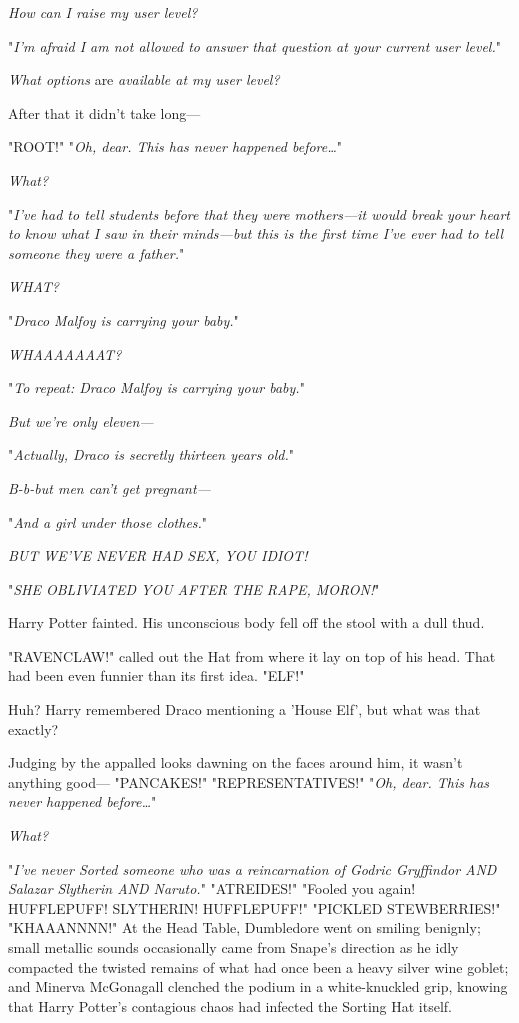\emph{How can I raise my user level?}

"\emph{I'm afraid I am not allowed to answer that question at your current user 
level.}"

\emph{What options} are\emph{ available at my user level?}

After that it didn't take long---

"ROOT!"
\sbreak
"\emph{Oh, dear. This has never happened before{\ldots}}"

\emph{What?}

"\emph{I've had to tell students before that they were mothers---it would break 
your heart to know what I saw in their minds---but this is the first time I've 
ever had to tell someone they were a father.}"

\emph{WHAT?}

"\emph{Draco Malfoy is carrying your baby.}"

\emph{WHAAAAAAAT?}

"\emph{To repeat: Draco Malfoy is carrying your baby.}"

\emph{But we're only eleven---}

"\emph{Actually, Draco is secretly thirteen years old.}"

\emph{B-b-but men can't get pregnant---}

"\emph{And a girl under those clothes.}"

\emph{BUT WE'VE NEVER HAD SEX, YOU IDIOT!}

"\emph{SHE OBLIVIATED YOU AFTER THE RAPE, MORON!}"

Harry Potter fainted. His unconscious body fell off the stool with a dull thud.

"RAVENCLAW!" called out the Hat from where it lay on top of his head. That had 
been even funnier than its first idea.
\sbreak
"ELF!"

Huh? Harry remembered Draco mentioning a 'House Elf', but what was that exactly?

Judging by the appalled looks dawning on the faces around him, it wasn't 
anything good---
\sbreak
"PANCAKES!"
\sbreak
"REPRESENTATIVES!"
\sbreak
"\emph{Oh, dear. This has never happened before{\ldots}}"

\emph{What?}

"\emph{I've never Sorted someone who was a reincarnation of Godric Gryffindor 
AND Salazar Slytherin AND Naruto.}"
\sbreak
"ATREIDES!"
\sbreak
"Fooled you again! HUFFLEPUFF! SLYTHERIN! HUFFLEPUFF!"
\sbreak
"PICKLED STEWBERRIES!"
\sbreak
"KHAAANNNN!"
\sbreak
At the Head Table, Dumbledore went on smiling benignly; small metallic sounds 
occasionally came from Snape's direction as he idly compacted the twisted 
remains of what had once been a heavy silver wine goblet; and Minerva 
McGonagall clenched the podium in a white-knuckled grip, knowing that Harry 
Potter's contagious chaos had infected the Sorting Hat itself.

